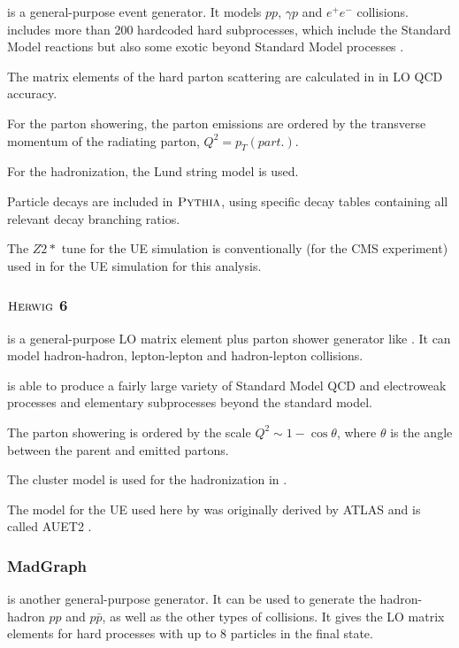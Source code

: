 \PYTHIA \cite{Sjostrand:2006za} is a general-purpose event generator. It models $pp$, $\gamma p$ and $e^{+}e^{-}$ collisions. \PYTHIA includes more than 200 hardcoded
hard subprocesses, which include the Standard Model reactions but also some exotic beyond Standard Model processes \cite{Buckley:2011ms}.

The matrix elements of the hard parton scattering are calculated in \PYTHIA in LO QCD accuracy.

For the parton showering, the parton emissions are ordered by the transverse momentum of the radiating parton, $Q^{2} = p_{T}(part.)$.

For the hadronization, the Lund string model is used.

Particle decays are included in $\textsc{Pythia}$, using specific decay tables containing all relevant decay branching ratios.

The $Z2*$ tune for the UE simulation is conventionally (for the CMS experiment) used in \PYTHIA for the UE simulation for this analysis.

\subsubsection{$\textsc{Herwig}$ 6}

\HERWIG \cite{Corcella:2000bw} is a general-purpose LO matrix element plus parton shower generator like \PYTHIA. It can model hadron-hadron, 
lepton-lepton and hadron-lepton collisions.

\HERWIG is able to produce a fairly large variety of Standard Model QCD and electroweak processes and elementary subprocesses beyond the standard model.

The parton showering is ordered by the scale $Q^{2} \sim 1 - \cos\theta$, where $\theta$ is the angle between the parent and emitted partons.

The cluster model is used for the hadronization in \HERWIG.

The model for the UE used here by \HERWIG was originally derived by ATLAS and is called AUET2 \cite{ATL-PHYS-PUB-2011-009}.

\subsubsection{MadGraph}

\MG is another general-purpose generator. It can be used to generate the hadron-hadron $pp$ and $p\bar{p}$, as well as the other types of collisions.
It gives the LO matrix elements for hard processes with up to 8 particles in the final state. 

